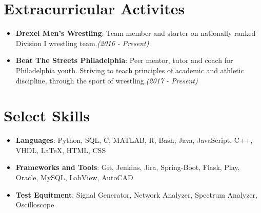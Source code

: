 \documentclass[letterpaper,11pt]{article}
\newcommand{\resumeItem}[2]{
  \item\small{
    \textbf{#1}{: #2 \vspace{-2pt}}
  }
}
\newcommand{\resumeSubItem}[2]{\resumeItem{#1}{#2}\vspace{-4pt}}
\newcommand{\resumeSubHeadingListStart}{\begin{itemize}[leftmargin=*]}
\newcommand{\resumeSubHeadingListEnd}{\end{itemize}}
\begin{document}
\section{Extracurricular Activites}
  \resumeSubHeadingListStart
    \resumeSubItem{Drexel Men's Wrestling}
      {Team member and starter on nationally ranked Division I wrestling team.\textit{(2016 - Present)}}
    \resumeSubItem{Beat The Streets Philadelphia}
      {Peer mentor, tutor and coach for Philadelphia youth. Striving to teach principles of academic and athletic discipline, through the sport of wrestling.\textit{(2017 - Present)}}
  \resumeSubHeadingListEnd

%
\section{Select Skills}
  \resumeSubHeadingListStart
  \resumeSubItem{Languages}
      {Python, SQL, C, MATLAB, R, Bash, Java, JavaScript, C++, VHDL, LaTeX, HTML, CSS}
    \resumeSubItem{Frameworks and Tools}
      {Git, Jenkins, Jira, Spring-Boot, Flask, Play, Oracle, MySQL, LabView, AutoCAD}
    \resumeSubItem{Test Equitment}
      {Signal Generator, Network Analyzer, Spectrum Analyzer, Oscilloscope}
  \resumeSubHeadingListEnd


\end{document}
